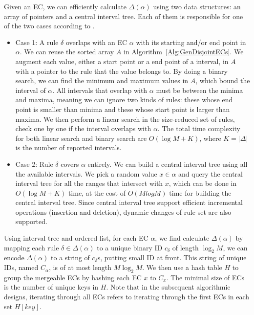 Given an EC, we can efficiently calculate $\Delta(\alpha)$ using two data structures: an array of pointers and a central interval tree.
Each of them is responsible for one of the two cases according to \cite{FindIntersectionWiki}.
\begin{itemize}
\item Case 1: A rule $\delta$ overlaps with an EC $\alpha$ with its starting and/or end point in $\alpha$.
        We can reuse the sorted array $A$ in Algorithm~\ref{Alg:GenDisjointECs}.
        We augment each value, either a start point or a end point of a interval, in $A$ with a pointer to the rule that the value belongs to.
        By doing a binary search, we can find the minimum and maximum values in $A$,
        which bound the interval of $\alpha$.
        All intervals that overlap with $\alpha$ must be between the minima and maxima,
        meaning we can ignore two kinds of rules: these whose end point is
        smaller than minima and these whose start point is larger than maxima.
        We then perform a linear search in the size-reduced set of rules,
        check one by one if the interval overlaps with $\alpha$.
        The total time complexity for both linear search and binary search are $O(\log M + K)$,
        where $K=|\Delta|$ is the number of reported intervals.
\item Case 2: Rule $\delta$ covers $\alpha$ entirely. We can build
        a central interval tree\cite{ComputationalGeometryBook} using all the available intervals.
        We pick a random value $x \in \alpha$ and query the central interval tree for
        all the ranges that intersect with $x$, which can be done in $O(\log M + K)$ time,
        at the cost of $O(M log M)$ time for building the central interval tree.
        Since central interval tree support efficient incremental operations (insertion and deletion),
        dynamic changes of rule set are also supported.
\end{itemize}

Using interval tree and ordered list, for each EC $\alpha$,
we find calculate $\Delta(\alpha)$ by mapping each rule $\delta \in \Delta(\alpha)$ to a unique binary ID $c_\delta$ of length $\log_2 M$,
we can encode $\Delta(\alpha)$ to a string of $c_\delta$s, putting small ID at front.
This string of unique IDs, named $C_\alpha$, is of at most length $M\log_2 M$.
We then use a hash table $H$ to group the mergeable ECs by hashing each EC $x$ to $C_x$.
The minimal size of ECs is the number of unique keys in $H$.
Note that in the subsequent algorithmic designs, iterating through all ECs refers to iterating through the first ECs in each set $H[key]$.%

